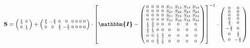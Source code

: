 \documentclass[10pt]{article} \usepackage{amsmath} \usepackage{bbold}
\begin{document}
\[ \mathbf{S} = \left(\begin{smallmatrix} \frac{1}{3} & 0 \\ 0 &
\frac{1}{3} \end{smallmatrix}\right) + \left(\begin{smallmatrix}
\frac{2}{3} & -\frac{2}{3} & 0 & 0 & 0 & 0 & 0 & 0 \\ 0 & 0 &
\frac{2}{3} & -\frac{2}{3} & 0 & 0 & 0 & 0 \end{smallmatrix}\right)
\cdot \left[ \boldsymbol{\mathbbm{I}}  - \left(\begin{smallmatrix} 0 &
0 & 0 & 0 & S_{11} & S_{12} & S_{13} & S_{14} \\ 0 & 0 & 0 & 0 &
S_{21} & S_{22} & S_{23} & S_{24} \\ 0 & 0 & 0 & 0 & S_{31} & S_{32} &
S_{33} & S_{34} \\ 0 & 0 & 0 & 0 & S_{41} & S_{42} & S_{43} & S_{44}
\\ \frac{1}{3} & \frac{2}{3} & 0 & 0 & 0 & 0 & 0 & 0 \\ \frac{2}{3} &
\frac{1}{3} & 0 & 0 & 0 & 0 & 0 & 0 \\ 0 & 0 & \frac{1}{3} &
\frac{2}{3} & 0 & 0 & 0 & 0 \\ 0 & 0 & \frac{2}{3} & \frac{1}{3} & 0 &
0 & 0 & 0 \end{smallmatrix}\right) \right]^{-1}
\cdot\left(\begin{smallmatrix} 0 & 0 \\ 0 & 0 \\ 0 & 0 \\ 0 & 0 \\
\frac{2}{3} & 0 \\ -\frac{2}{3} & 0 \\ 0 & \frac{2}{3} \\ 0 &
-\frac{2}{3} \end{smallmatrix}\right) \]
\end{document}

